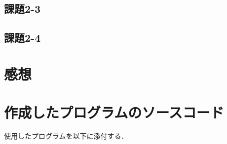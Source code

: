 \subsection{課題2-3}

\subsection{課題2-4}


\section{感想}


\section{作成したプログラムのソースコード} \label{sec:makep}

使用したプログラムを以下に添付する．


